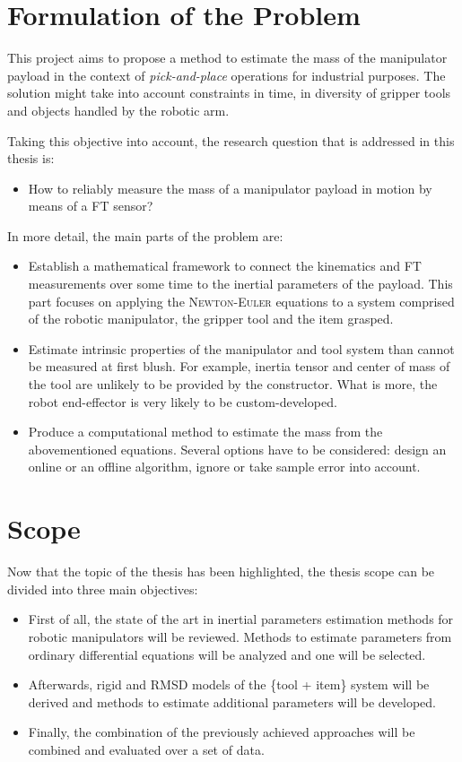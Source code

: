 \documentclass[/home/francois/latex/report/main.tex]{subfiles}
\begin{document}
\section{Formulation of the Problem}

This project aims to propose a method to estimate the mass of the manipulator payload in the context of \textit{pick-and-place} operations for industrial purposes. The solution might take into account constraints in time, in diversity of gripper tools and objects handled by the robotic arm.

Taking this objective into account, the research question that is addressed in this thesis is:

\begin{itemize}
 \item[] How to reliably measure the mass of a manipulator payload in motion by means of a \ac{FT} sensor?
\end{itemize}

In more detail, the main parts of the problem are:

\begin{itemize}
 \item Establish a mathematical framework to connect the kinematics and \ac{FT} measurements over some time to the inertial parameters of the payload. This part focuses on applying the \textsc{Newton-Euler} equations to a system comprised of the robotic manipulator, the gripper tool and the item grasped.
 \item Estimate intrinsic properties of the manipulator and tool system than cannot be measured at first blush. For example, inertia tensor and center of mass of the tool are unlikely to be provided by the constructor. What is more, the robot end-effector is very likely to be custom-developed.
 \item Produce a computational method to estimate the mass from the abovementioned equations. Several options have to be considered: design an online or an offline algorithm, ignore or take sample error into account.
\end{itemize}

\section{Scope}

Now that the topic of the thesis has been highlighted, the thesis scope can be divided into three main objectives:

\begin{itemize}
    \item First of all, the state of the art in inertial parameters estimation methods for robotic manipulators will be reviewed. Methods to estimate parameters from ordinary differential equations will be analyzed and one will be selected.
    \item Afterwards, rigid and \ac{RMSD} models of the \{tool + item\} system will be derived and methods to estimate additional parameters will be developed.
    \item Finally, the combination of the previously achieved approaches will be combined and evaluated over a set of data.
\end{itemize}
\end{document}
